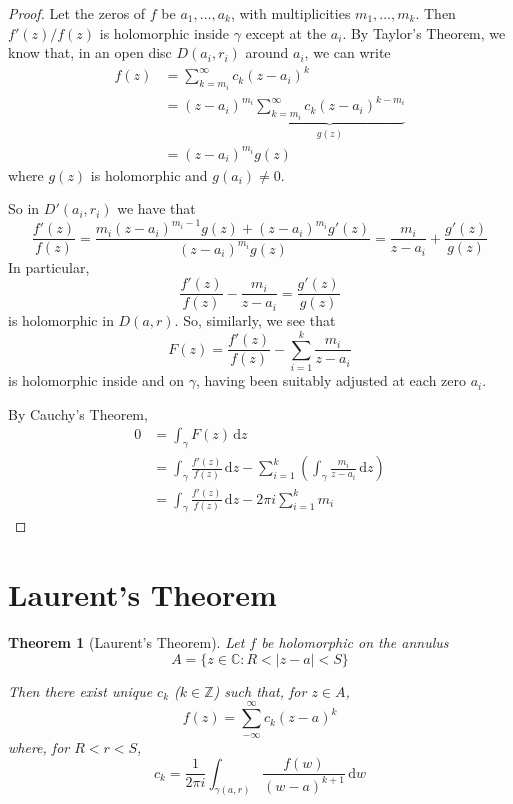 \documentclass[10pt,fleqn]{article}
\newcommand{\diff}{\,\mathrm{d}}
\newcommand{\comps}{\mathbb{C}}
\theoremstyle{definition} \newtheorem{defn}{Definition}[section]
\theoremstyle{plain}      \newtheorem{thm}[defn]{Theorem}
\theoremstyle{definition} \newtheorem{prop}[defn]{Proposition}
\theoremstyle{plain}      \newtheorem{lem}[defn]{Lemma}
\theoremstyle{definition} \newtheorem{cor}[defn]{Corollary}
\theoremstyle{definition} \newtheorem{ex}[defn]{Example}
\theoremstyle{definition} \newtheorem{rem}[defn]{Remark}
\begin{document}
\begin{proof}
    Let the zeros of $f$ be $a_1,\ldots,a_k$, with multiplicities $m_1,\ldots,m_k$.
    Then $f'(z)/f(z)$ is holomorphic inside $\gamma$ except at the $a_i$.
    By Taylor's Theorem, we know that, in an open disc $D(a_i,r_i)$ around $a_i$, we can write
    \begin{align*}
        f(z)
        &=
        \sum_{k=m_i}^{\infty}c_k(z-a_i)^k\\
        &=
        (z-a_i)^{m_i}\underbrace{\sum_{k=m_i}^{\infty}c_k(z-a_i)^{k-m_i}}_{g(z)}\\
        &=
        (z-a_i)^{m_i}g(z)
    \end{align*}
    where $g(z)$ is holomorphic and $g(a_i)\neq0$.

    So in $D'(a_i,r_i)$ we have that
    \[
        \frac{f'(z)}{f(z)}=
        \frac{m_i(z-a_i)^{m_i-1}g(z)+(z-a_i)^{m_i}g'(z)}{(z-a_i)^{m_i}g(z)}=
        \frac{m_i}{z-a_i}+\frac{g'(z)}{g(z)}
    \]
    In particular,
    \[
        \frac{f'(z)}{f(z)}-\frac{m_i}{z-a_i}=
        \frac{g'(z)}{g(z)}
    \]
    is holomorphic in $D(a,r)$.
    So, similarly, we see that
    \[
        F(z)=
        \frac{f'(z)}{f(z)}-\sum_{i=1}^{k}\frac{m_i}{z-a_i}
    \]
    is holomorphic inside and on $\gamma$, having been suitably adjusted at each zero $a_i$.

    By Cauchy's Theorem,
    \begin{align*}
        0
        &=
        \int_{\gamma} F(z)\diff z\\
        &=
        \int_{\gamma} \frac{f'(z)}{f(z)}\diff z-\sum_{i=1}^{k}\left(\int_{\gamma}\frac{m_i}{z-a_i}\diff z\right)\\
        &=
        \int_{\gamma} \frac{f'(z)}{f(z)}\diff z-2\pi i\sum_{i=1}^k m_i
    \end{align*}
\end{proof}


\section{Laurent's Theorem}

\begin{thm}[Laurent's Theorem]
    Let $f$ be holomorphic on the annulus
    \[
        A=
        \{z\in\comps\colon R<|z-a|<S\}
    \]

    Then there exist unique $c_k$ ($k\in\mathbb{Z}$) such that, for $z\in A$,
    \[
        f(z)=
        \sum_{-\infty}^{\infty}c_k(z-a)^k
    \]
    where, for $R<r<S$,
    \[
        c_k=
        \frac{1}{2\pi i}\int_{\gamma(a,r)}\frac{f(w)}{(w-a)^{k+1}}\diff w
    \]
\end{thm}
\end{document}

